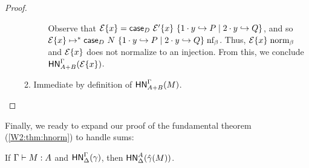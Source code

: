 \documentclass{article}
\begin{document}
\begin{proof}
\begin{itemize}
\begin{enumerate}
\begin{itemize}
        Observe that $\mathcal{E}\{x\} = \mathsf{case}_{D}\ \mathcal{E}'\{x\}\ \{1\cdot y \hookrightarrow P \mid 2\cdot y \hookrightarrow Q\}$, and so $\mathcal{E}\{x\} \mapsto^* \mathsf{case}_{D}\ N\ \{1\cdot y \hookrightarrow P \mid 2\cdot y \hookrightarrow Q\} \mathrel{\text{nf}_\beta}$.
        Thus, $\mathcal{E}\{x\} \mathrel{\text{norm}_\beta}$ and $\mathcal{E}\{x\}$ does not normalize to an injection.
        From this, we conclude $\mathsf{HN}^{\Gamma}_{A+B}(\mathcal{E}\{x\})$.
      \end{itemize}
    \item Immediate by definition of $\mathsf{HN}^{\Gamma}_{A+B}(M)$.\qedhere
    \end{enumerate}
  \end{itemize}
\end{proof}

Finally, we ready to expand our proof of the fundamental theorem (\cref{W2:thm:hnorm}) to handle sums:

\begin{theorem}[FTLR]
  If $\Gamma \vdash M : A$ and $\mathsf{HN}^{\Gamma}_{\Delta}(\gamma)$, then $\mathsf{HN}^{A}_{\Delta}(\hat\gamma(M))$.
\end{theorem}
\end{document}
